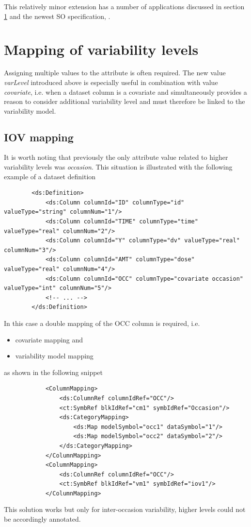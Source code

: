 This relatively minor extension has a number of applications discussed in 
section \ref{sec:higherVarLevels} and the newest SO specification, \cite{SO:2016b}.


\section{Mapping of variability levels}
\label{sec:higherVarLevels}

Assigning multiple values to the  attribute is often required.
The new value \emph{varLevel} introduced above is especially useful in combination 
with value \emph{covariate}, i.e. when a dataset column is a covariate and simultaneously 
provides a reason to consider additional variability level and must therefore be linked to the variability model.

\subsection{IOV mapping}

It is worth noting that previously the only  attribute value related 
to higher variability levels was \emph{occasion}. This situation is illustrated with the 
following example of a dataset definition
\lstset{language=XML}
\begin{lstlisting}
        <ds:Definition>
            <ds:Column columnId="ID" columnType="id" valueType="string" columnNum="1"/>
            <ds:Column columnId="TIME" columnType="time" valueType="real" columnNum="2"/>
            <ds:Column columnId="Y" columnType="dv" valueType="real" columnNum="3"/>
            <ds:Column columnId="AMT" columnType="dose" valueType="real" columnNum="4"/>
            <ds:Column columnId="OCC" columnType="covariate occasion" valueType="int" columnNum="5"/>
            <!-- ... -->
        </ds:Definition>
\end{lstlisting}
\smallskip
In this case a double mapping of the OCC column is required, i.e. 
\begin{itemize}	
\item 
covariate mapping and
\item 
variability model mapping 
\end{itemize}
as shown in the following snippet
\lstset{language=XML}
\begin{lstlisting}
            <ColumnMapping>
                <ds:ColumnRef columnIdRef="OCC"/>
                <ct:SymbRef blkIdRef="cm1" symbIdRef="Occasion"/>
                <ds:CategoryMapping>
                    <ds:Map modelSymbol="occ1" dataSymbol="1"/>
                    <ds:Map modelSymbol="occ2" dataSymbol="2"/>
                </ds:CategoryMapping>
            </ColumnMapping>
            <ColumnMapping>
                <ds:ColumnRef columnIdRef="OCC"/>
                <ct:SymbRef blkIdRef="vm1" symbIdRef="iov1"/>
            </ColumnMapping>
\end{lstlisting}
This solution works but only for inter-occasion variability, higher levels could not 
be accordingly annotated.

